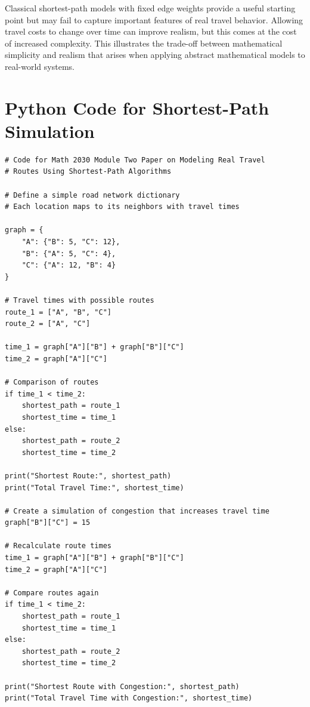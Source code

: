 \documentclass{article}
\begin{document}
Classical shortest-path models with fixed edge weights provide a useful starting point but may fail to capture important features of real travel behavior. Allowing travel costs to change over time can improve realism, but this comes at the cost of increased complexity. This illustrates the trade-off between mathematical simplicity and realism that arises when applying abstract mathematical models to real-world systems. 

 
 



\appendix
\section{Python Code for Shortest-Path Simulation}
\label{app:python-code} 

\begin{lstlisting}[caption={Python code for modeling real travel routes using shortest-path logic}]
# Code for Math 2030 Module Two Paper on Modeling Real Travel
# Routes Using Shortest-Path Algorithms

# Define a simple road network dictionary
# Each location maps to its neighbors with travel times

graph = {
    "A": {"B": 5, "C": 12},
    "B": {"A": 5, "C": 4},
    "C": {"A": 12, "B": 4}
}

# Travel times with possible routes
route_1 = ["A", "B", "C"]
route_2 = ["A", "C"]

time_1 = graph["A"]["B"] + graph["B"]["C"]
time_2 = graph["A"]["C"]

# Comparison of routes
if time_1 < time_2:
    shortest_path = route_1
    shortest_time = time_1
else:
    shortest_path = route_2
    shortest_time = time_2

print("Shortest Route:", shortest_path)
print("Total Travel Time:", shortest_time)

# Create a simulation of congestion that increases travel time
graph["B"]["C"] = 15

# Recalculate route times
time_1 = graph["A"]["B"] + graph["B"]["C"]
time_2 = graph["A"]["C"]

# Compare routes again
if time_1 < time_2:
    shortest_path = route_1
    shortest_time = time_1
else:
    shortest_path = route_2
    shortest_time = time_2

print("Shortest Route with Congestion:", shortest_path)
print("Total Travel Time with Congestion:", shortest_time)
\end{lstlisting}
\end{document}
